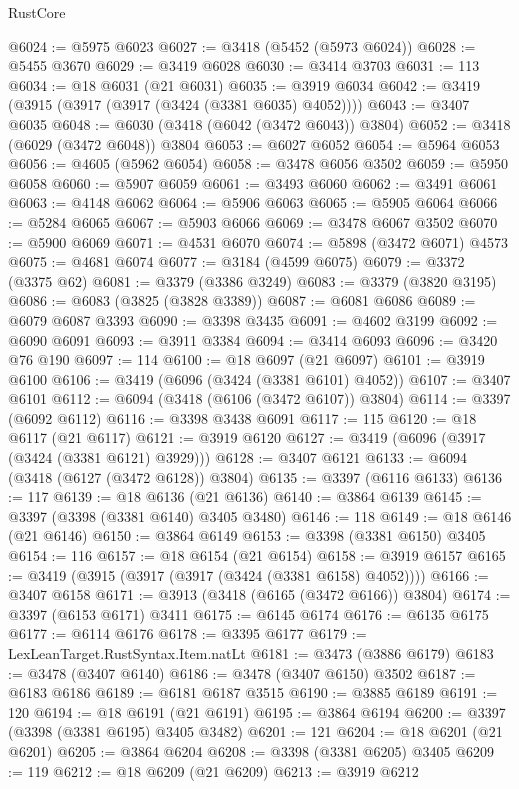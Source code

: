 \begin{lexlean}{RustCore}
\begin{coremodule}
@6024 := @5975 @6023
@6027 := @3418 (@5452 (@5973 @6024))
@6028 := @5455 @3670
@6029 := @3419 @6028
@6030 := @3414 @3703
@6031 := 113
@6034 := @18 @6031 (@21 @6031)
@6035 := @3919 @6034
@6042 := @3419 (@3915 (@3917 (@3917 (@3424 (@3381 @6035) @4052))))
@6043 := @3407 @6035
@6048 := @6030 (@3418 (@6042 (@3472 @6043)) @3804)
@6052 := @3418 (@6029 (@3472 @6048)) @3804
@6053 := @6027 @6052
@6054 := @5964 @6053
@6056 := @4605 (@5962 @6054)
@6058 := @3478 @6056 @3502
@6059 := @5950 @6058
@6060 := @5907 @6059
@6061 := @3493 @6060
@6062 := @3491 @6061
@6063 := @4148 @6062
@6064 := @5906 @6063
@6065 := @5905 @6064
@6066 := @5284 @6065
@6067 := @5903 @6066
@6069 := @3478 @6067 @3502
@6070 := @5900 @6069
@6071 := @4531 @6070
@6074 := @5898 (@3472 @6071) @4573
@6075 := @4681 @6074
@6077 := @3184 (@4599 @6075)
@6079 := @3372 (@3375 @62)
@6081 := @3379 (@3386 @3249)
@6083 := @3379 (@3820 @3195)
@6086 := @6083 (@3825 (@3828 @3389))
@6087 := @6081 @6086
@6089 := @6079 @6087 @3393
@6090 := @3398 @3435
@6091 := @4602 @3199
@6092 := @6090 @6091
@6093 := @3911 @3384
@6094 := @3414 @6093
@6096 := @3420 @76 @190
@6097 := 114
@6100 := @18 @6097 (@21 @6097)
@6101 := @3919 @6100
@6106 := @3419 (@6096 (@3424 (@3381 @6101) @4052))
@6107 := @3407 @6101
@6112 := @6094 (@3418 (@6106 (@3472 @6107)) @3804)
@6114 := @3397 (@6092 @6112)
@6116 := @3398 @3438 @6091
@6117 := 115
@6120 := @18 @6117 (@21 @6117)
@6121 := @3919 @6120
@6127 := @3419 (@6096 (@3917 (@3424 (@3381 @6121) @3929)))
@6128 := @3407 @6121
@6133 := @6094 (@3418 (@6127 (@3472 @6128)) @3804)
@6135 := @3397 (@6116 @6133)
@6136 := 117
@6139 := @18 @6136 (@21 @6136)
@6140 := @3864 @6139
@6145 := @3397 (@3398 (@3381 @6140) @3405 @3480)
@6146 := 118
@6149 := @18 @6146 (@21 @6146)
@6150 := @3864 @6149
@6153 := @3398 (@3381 @6150) @3405
@6154 := 116
@6157 := @18 @6154 (@21 @6154)
@6158 := @3919 @6157
@6165 := @3419 (@3915 (@3917 (@3917 (@3424 (@3381 @6158) @4052))))
@6166 := @3407 @6158
@6171 := @3913 (@3418 (@6165 (@3472 @6166)) @3804)
@6174 := @3397 (@6153 @6171) @3411
@6175 := @6145 @6174
@6176 := @6135 @6175
@6177 := @6114 @6176
@6178 := @3395 @6177
@6179 := LexLeanTarget.RustSyntax.Item.natLt
@6181 := @3473 (@3886 @6179)
@6183 := @3478 (@3407 @6140)
@6186 := @3478 (@3407 @6150) @3502
@6187 := @6183 @6186
@6189 := @6181 @6187 @3515
@6190 := @3885 @6189
@6191 := 120
@6194 := @18 @6191 (@21 @6191)
@6195 := @3864 @6194
@6200 := @3397 (@3398 (@3381 @6195) @3405 @3482)
@6201 := 121
@6204 := @18 @6201 (@21 @6201)
@6205 := @3864 @6204
@6208 := @3398 (@3381 @6205) @3405
@6209 := 119
@6212 := @18 @6209 (@21 @6209)
@6213 := @3919 @6212

\end{coremodule}
\end{lexlean}
